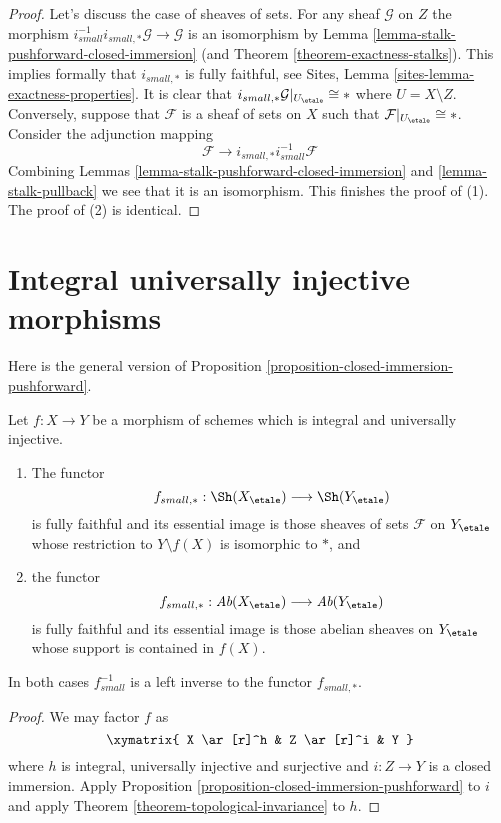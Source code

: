 \begin{proof}
Let's discuss the case of sheaves of sets.
For any sheaf $\mathcal{G}$ on $Z$ the morphism
$i_{small}^{-1}i_{small, *}\mathcal{G} \to \mathcal{G}$
is an isomorphism by
Lemma \ref{lemma-stalk-pushforward-closed-immersion}
(and
Theorem \ref{theorem-exactness-stalks}).
This implies formally that $i_{small, *}$ is fully faithful, see
Sites, Lemma \ref{sites-lemma-exactness-properties}.
It is clear that $i_{small, *}\mathcal{G}|_{U_\etale} \cong *$
where $U = X \setminus Z$. Conversely, suppose that $\mathcal{F}$
is a sheaf of sets on $X$ such that $\mathcal{F}|_{U_\etale} \cong *$.
Consider the adjunction mapping
$$
\mathcal{F} \longrightarrow i_{small, *}i_{small}^{-1}\mathcal{F}
$$
Combining
Lemmas \ref{lemma-stalk-pushforward-closed-immersion} and
\ref{lemma-stalk-pullback}
we see that it is an isomorphism. This finishes the proof of (1).
The proof of (2) is identical.
\end{proof}





\section{Integral universally injective morphisms}
\label{section-integral-universally-injective}

\noindent
Here is the general version of
Proposition \ref{proposition-closed-immersion-pushforward}.

\begin{proposition}
\label{proposition-integral-universally-injective-pushforward}
Let $f : X \to Y$ be a morphism of schemes which is integral
and universally injective.
\begin{enumerate}
\item The functor
$$
f_{small, *} :
\Sh(X_\etale)
\longrightarrow
\Sh(Y_\etale)
$$
is fully faithful and its essential image is those sheaves of sets
$\mathcal{F}$ on $Y_\etale$ whose restriction to $Y \setminus f(X)$ is
isomorphic to $*$, and
\item the functor
$$
f_{small, *} :
\textit{Ab}(X_\etale)
\longrightarrow
\textit{Ab}(Y_\etale)
$$
is fully faithful and its essential image is those abelian sheaves on
$Y_\etale$ whose support is contained in $f(X)$.
\end{enumerate}
In both cases $f_{small}^{-1}$ is a left inverse to the functor
$f_{small, *}$.
\end{proposition}

\begin{proof}
We may factor $f$ as
$$
\xymatrix{
X \ar[r]^h & Z \ar[r]^i & Y
}
$$
where $h$ is integral, universally injective and surjective
and $i : Z \to Y$ is a closed immersion.
Apply
Proposition \ref{proposition-closed-immersion-pushforward}
to $i$ and apply
Theorem \ref{theorem-topological-invariance}
to $h$.
\end{proof}









